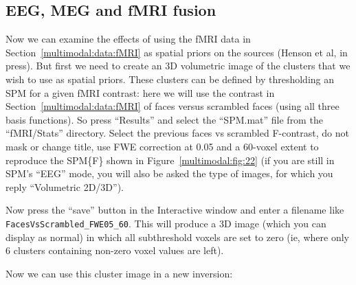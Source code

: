 \subsection{EEG, MEG and fMRI fusion \label{multimodal:fusion:fmri}}

Now we can examine the effects of using the fMRI data in Section~\ref{multimodal:data:fMRI} as spatial priors on the sources (Henson et al, in press). But first we need to create an 3D volumetric image of the clusters that we wish to use as spatial priors. These clusters can be defined by thresholding an SPM for a given fMRI contrast: here we will use the contrast in Section~\ref{multimodal:data:fMRI} of faces versus scrambled faces (using all three basis functions). So press ``Results'' and select the ``SPM.mat'' file from the ``fMRI/Stats'' directory. Select the previous faces vs scrambled F-contrast, do not mask or change title, use FWE correction at 0.05 and a 60-voxel extent to reproduce the SPM\{F\} shown in Figure~\ref{multimodal:fig:22} (if you are still in SPM's ``EEG'' mode, you will also be asked the type of images, for which you reply ``Volumetric 2D/3D'').

Now press the ``save'' button in the Interactive window and enter a filename like \texttt{Faces\-Vs\-Scrambled\_FWE05\_60}. This will produce a 3D image (which you can display as normal) in which all subthreshold voxels are set to zero (ie, where only 6 clusters containing non-zero voxel values are left).

Now we can use this cluster image in a new inversion:

